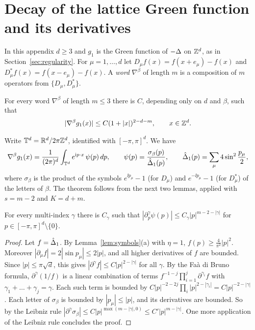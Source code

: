 \section{Decay of the lattice Green function and its derivatives}\label{app:green}

In this appendix $d\ge3$ and $g_1$ is the Green function of $-\Delta$ on $\mathbb Z^d$, as in Section~\ref{sec:regularity}. For $\mu=1,\dots,d$ let $D_\mu f(x)=f(x+e_\mu)-f(x)$ and $D^*_\mu f(x)=f(x-e_\mu)-f(x)$. A \emph{word} $\nabla^\beta$ of length $m$ is a composition of $m$ operators from $\{D_\mu,D_\mu^*\}$.

\begin{theorem}\label{thm:green-unit}
For every word $\nabla^\beta$ of length $m\le3$ there is $C$, depending only on $d$ and $\beta$, such that
\[
|\nabla^\beta g_1(x)|\le C(1+|x|)^{2-d-m},\qquad x\in\mathbb Z^d .
\]
\end{theorem}

Write $\mathbb T^d=\mathbb R^d/2\pi\mathbb Z^d$, identified with $[-\pi,\pi]^d$. We have
\[
\nabla^\beta g_1(x)=\frac1{(2\pi)^d}\int_{\mathbb T^d}e^{\mathrm i p\cdot x}\,\psi(p)\,dp,\qquad \psi(p)=\frac{\sigma_\beta(p)}{\hat{\Delta}_1(p)},\qquad\hat{\Delta}_1(p)=\sum_\mu4\sin^2\frac{p_\mu}2,
\]
where $\sigma_\beta$ is the product of the symbols $e^{\ii p_\mu}-1$ (for $D_\mu$) and $e^{-\ii p_\mu}-1$ (for $D_\mu^*$) of the letters of $\beta$. The theorem follows from the next two lemmas, applied with $s=m-2$ and $K=d+m$.

\begin{lemma}\label{lem:symbol-m}
For every multi-index $\gamma$ there is $C_\gamma$ such that $|\partial_p^\gamma \psi(p)|\le C_\gamma|p|^{m-2-|\gamma|}$ for $p\in[-\pi,\pi]^d\setminus\{0\}$.
\end{lemma}

\begin{proof}
Let $f=\hat{\Delta}_1$. By Lemma~\ref{lem:symbols}(a) with $\eta=1$, $f(p)\ge\frac4{\pi^2}|p|^2$. Moreover $|\partial_\mu f|=2|\sin p_\mu|\le2|p|$, and all higher derivatives of $f$ are bounded. Since $|p|\le\pi\sqrt d$, this gives $|\partial^\gamma f|\le C|p|^{2-|\gamma|}$ for all $\gamma$. By the Fa\`a di Bruno formula, $\partial^\gamma(1/f)$ is a linear combination of terms $f^{-1-j}\prod_{i=1}^j\partial^{\gamma_i}f$ with $\gamma_1+\dots+\gamma_j=\gamma$. Each such term is bounded by $C|p|^{-2-2j}\prod_i|p|^{2-|\gamma_i|}=C|p|^{-2-|\gamma|}$. Each letter of $\sigma_\beta$ is bounded by $|p_\mu|\le|p|$, and its derivatives are bounded. So by the Leibniz rule $|\partial^\gamma\sigma_\beta|\le C|p|^{\max(m-|\gamma|,0)}\le C'|p|^{m-|\gamma|}$. One more application of the Leibniz rule concludes the proof.
\end{proof}

